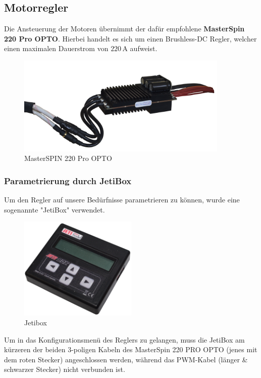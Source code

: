 

\newpage
\subsection{Motorregler}
Die Ansteuerung der Motoren übernimmt der dafür empfohlene \textbf{MasterSpin 220 Pro OPTO}.
Hierbei handelt es sich um einen Brushless-DC Regler, welcher einen maximalen Dauerstrom von $220\,\mathrm{A}$ aufweist.
\begin{figure}[h]
    \centering
    \includegraphics[width=0.9\textwidth]{Fotos/MasterSpin_ohne_Halter.png}
    \caption{MasterSPIN 220 Pro OPTO}
\end{figure}
\subsubsection*{Parametrierung durch JetiBox}
Um den Regler auf unsere Bedürfnisse parametrieren zu können, wurde eine sogenannte "JetiBox" verwendet.
\begin{figure}[h]
    \centering
    \includegraphics[width=0.5\textwidth]{Fotos/JetiBox.png}
    \caption{Jetibox}
\end{figure}
\newpage
Um in das Konfigurationsmenü des Reglers zu gelangen, muss die JetiBox am kürzeren der beiden 3-poligen Kabeln des MasterSpin 220 PRO OPTO (jenes mit dem roten Stecker) angeschlossen werden, 
während das PWM-Kabel (länger \& schwarzer Stecker) nicht verbunden ist.\\

